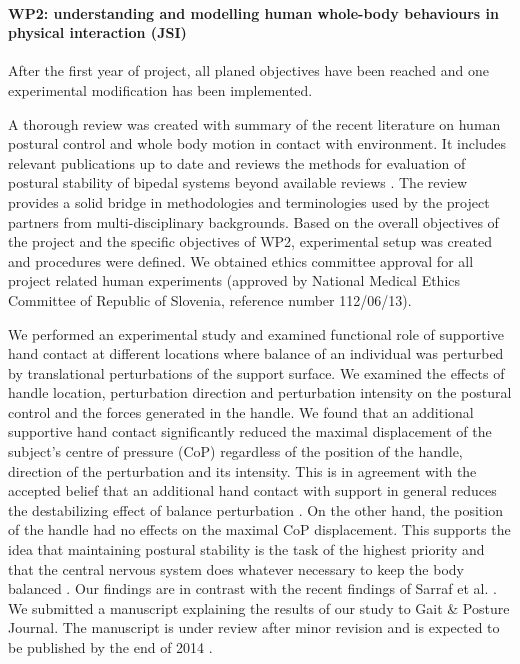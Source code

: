 \documentclass[12pt,a4paper,twoside]{article}
\begin{document}
\paragraph*{WP2: understanding and modelling human whole-body behaviours in physical interaction (JSI)}

After the first year of project, all planed objectives have been reached and one experimental modification has been implemented.

A thorough review was created with summary of the recent literature on human postural control and whole body motion in contact with environment. It includes relevant publications up to date and reviews the methods for evaluation of postural stability of bipedal systems beyond available reviews \cite{Mergner2007, Azevedo2007}. The review provides a solid bridge in methodologies and terminologies used by the project partners from multi-disciplinary backgrounds. Based on the overall objectives of the project and the specific objectives of WP2, experimental setup was created and procedures were defined. We obtained ethics committee approval for all project related human experiments (approved by National Medical Ethics Committee of Republic of Slovenia, reference number 112/06/13).

We performed an experimental study and examined functional role of supportive hand contact at different locations where balance of an individual was perturbed by translational perturbations of the support surface. We examined the effects of handle location, perturbation direction and perturbation intensity on the postural control and the forces generated in the handle. We found that an additional supportive hand contact significantly reduced the maximal displacement of the subject's centre of pressure (CoP) regardless of the position of the handle, direction of the perturbation and its intensity. This is in agreement with the accepted belief that an additional hand contact with support in general reduces the destabilizing effect of balance perturbation \cite{Maki1997, Bateni2005, Maki2006, Wing2011}. On the other hand, the position of the handle had no effects on the maximal CoP displacement. This supports the idea that maintaining postural stability is the task of the highest priority and that the central nervous system does whatever necessary to keep the body balanced \cite{Winter1995}. Our findings are in contrast with the recent findings of Sarraf et al. \cite{Sarraf2014}. We submitted a manuscript explaining the results of our study to Gait \& Posture Journal. The manuscript is under review after minor revision and is expected to be published by the end of 2014 \cite{Babic2014}.
\end{document}
